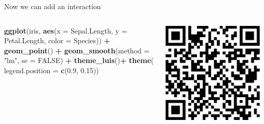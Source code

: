 \documentclass[australian,ignorenonframetext,aspectratio=169]{beamer}
\newenvironment{Shaded}{\begin{snugshade}}{\end{snugshade}}
\newcommand{\DataTypeTok}[1]{\textcolor[rgb]{0.13,0.29,0.53}{#1}}
\newcommand{\FloatTok}[1]{\textcolor[rgb]{0.00,0.00,0.81}{#1}}
\newcommand{\KeywordTok}[1]{\textcolor[rgb]{0.13,0.29,0.53}{\textbf{#1}}}
\newcommand{\NormalTok}[1]{#1}
\newcommand{\OperatorTok}[1]{\textcolor[rgb]{0.81,0.36,0.00}{\textbf{#1}}}
\newcommand{\OtherTok}[1]{\textcolor[rgb]{0.56,0.35,0.01}{#1}}
\newcommand{\StringTok}[1]{\textcolor[rgb]{0.31,0.60,0.02}{#1}}
\begin{document}
\begin{frame}[fragile]{Now we can add an interaction}
\protect\hypertarget{now-we-can-add-an-interaction-2}{}

\begin{columns}[T]
\begin{column}{0.5\textwidth}
\tiny

\begin{Shaded}
\begin{Highlighting}[]
\KeywordTok{ggplot}\NormalTok{(iris, }\KeywordTok{aes}\NormalTok{(}\DataTypeTok{x =}\NormalTok{ Sepal.Length, }\DataTypeTok{y =}\NormalTok{ Petal.Length, }\DataTypeTok{color =}\NormalTok{ Species)) }\OperatorTok{+}
\StringTok{  }\KeywordTok{geom\_point}\NormalTok{() }\OperatorTok{+}\StringTok{ }
\StringTok{  }\KeywordTok{geom\_smooth}\NormalTok{(}\DataTypeTok{method =} \StringTok{"lm"}\NormalTok{, }\DataTypeTok{se =} \OtherTok{FALSE}\NormalTok{) }\OperatorTok{+}
\StringTok{  }\KeywordTok{theme\_luis}\NormalTok{()}\OperatorTok{+}
\StringTok{  }\KeywordTok{theme}\NormalTok{( }\DataTypeTok{legend.position =} \KeywordTok{c}\NormalTok{(}\FloatTok{0.9}\NormalTok{, }\FloatTok{0.15}\NormalTok{))}
\end{Highlighting}
\end{Shaded}
\end{column}

\begin{column}{0.5\textwidth}
\includegraphics{../graphs/unnamed-chunk-10-1.pdf}
\end{column}
\end{columns}

\end{frame}
\end{document}
